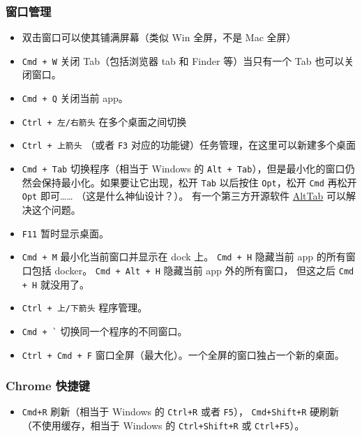\subsubsection{窗口管理}
\begin{itemize}
\item 双击窗口可以使其铺满屏幕（类似 Win 全屏，不是 Mac 全屏）
\item \verb`Cmd + W` 关闭 Tab（包括浏览器 tab 和 Finder 等）当只有一个 Tab 也可以关闭窗口。
\item \verb`Cmd + Q` 关闭当前 app。
\item \verb`Ctrl + 左/右箭头` 在多个桌面之间切换
\item \verb`Ctrl + 上箭头` （或者 \verb`F3` 对应的功能键）任务管理，在这里可以新建多个桌面
\item \verb`Cmd + Tab` 切换程序（相当于 Windows 的 \verb`Alt + Tab`），但是最小化的窗口仍然会保持最小化。如果要让它出现，松开 \verb`Tab` 以后按住 \verb`Opt`，松开 \verb`Cmd` 再松开 \verb`Opt` 即可…… （这是什么神仙设计？）。 有一个第三方开源软件 \href{https://alt-tab-macos.netlify.app/}{AltTab} 可以解决这个问题。
\item \verb`F11` 暂时显示桌面。
\item \verb`Cmd + M` 最小化当前窗口并显示在 dock 上。 \verb`Cmd + H` 隐藏当前 app 的所有窗口包括 docker。 \verb`Cmd + Alt + H` 隐藏当前 app 外的所有窗口， 但这之后 \verb`Cmd + H` 就没用了。
\item \verb`Ctrl + 上/下箭头` 程序管理。
\item \verb|Cmd + `| 切换同一个程序的不同窗口。
\item \verb`Ctrl + Cmd + F` 窗口全屏（最大化）。一个全屏的窗口独占一个新的桌面。
\end{itemize}

\subsubsection{Chrome 快捷键}
\begin{itemize}
\item \verb`Cmd+R` 刷新（相当于 Windows 的 \verb`Ctrl+R` 或者 \verb`F5`）， \verb`Cmd+Shift+R` 硬刷新（不使用缓存，相当于 Windows 的 \verb`Ctrl+Shift+R` 或 \verb`Ctrl+F5`）。
\end{itemize}


